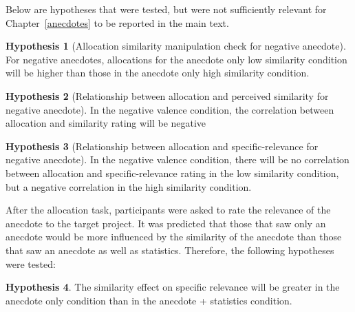 \documentclass[a4paper, nobind]{templates/ociamthesis}
\theoremstyle{definition}
\theoremstyle{definition}
\theoremstyle{definition}
\theoremstyle{definition}
\newtheorem{hypothesis}{Hypothesis}[chapter]
\theoremstyle{remark}
\begin{document}
Below are hypotheses that were tested, but were not sufficiently relevant for
Chapter~\ref{anecdotes} to be reported in the main text.

\begin{hypothesis}[Allocation similarity manipulation check for negative anecdote]
\protect\hypertarget{hyp:similarity-check-anecdotes-1}{}{\label{hyp:similarity-check-anecdotes-1} \iffalse (Allocation similarity manipulation check for negative anecdote) \fi{} }For negative anecdotes, allocations for the anecdote only low similarity
condition will be higher than those in the anecdote only high similarity
condition.
\end{hypothesis}

\begin{hypothesis}[Relationship between allocation and perceived similarity for negative anecdote]
\protect\hypertarget{hyp:allocation-similarity-anecdotes-1}{}{\label{hyp:allocation-similarity-anecdotes-1} \iffalse (Relationship between allocation and perceived similarity for negative anecdote) \fi{} }In the negative valence condition, the correlation between allocation and
similarity rating will be negative
\end{hypothesis}

\begin{hypothesis}[Relationship between allocation and specific-relevance for negative anecdote]
\protect\hypertarget{hyp:allocation-specific-relevance-anecdotes-1}{}{\label{hyp:allocation-specific-relevance-anecdotes-1} \iffalse (Relationship between allocation and specific-relevance for negative anecdote) \fi{} }In the negative valence condition, there will be no correlation between
allocation and specific-relevance rating in the low similarity condition, but a
negative correlation in the high similarity condition.
\end{hypothesis}

After the allocation task, participants were asked to rate the relevance of the
anecdote to the target project. It was predicted that those that saw only an
anecdote would be more influenced by the similarity of the anecdote than those
that saw an anecdote as well as statistics. Therefore, the following hypotheses
were tested:

\begin{hypothesis}
\protect\hypertarget{hyp:relevance-specific-anecdotes-1}{}{\label{hyp:relevance-specific-anecdotes-1} }The similarity effect on specific relevance will be greater in the anecdote only
condition than in the anecdote + statistics condition.
\end{hypothesis}
\end{document}
